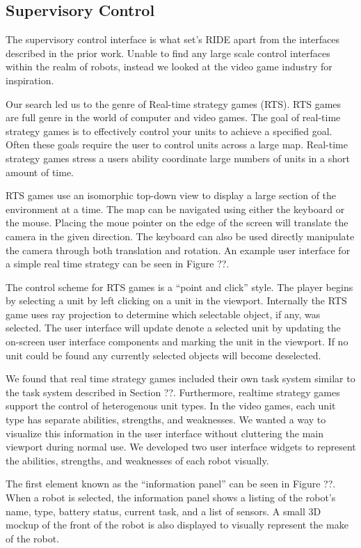 \subsection{Supervisory Control}
\label{subs:ui-supervisor}

The supervisory control interface is what set's RIDE apart from the interfaces described in the prior work. Unable to find any large scale control interfaces within the realm of robots, instead we looked at the video game industry for inspiration.

Our search led us to the genre of Real-time strategy games (RTS). RTS games are full genre in the world of computer and video games. The goal of real-time strategy games is to effectively control your units to achieve a specified goal. Often these goals require the user to control units across a large  map. Real-time strategy games stress a users ability coordinate large numbers of units in a short amount of time. 

RTS games use an isomorphic top-down view to display a large section of the environment at a time. The map can be navigated using either the keyboard or the mouse. Placing the moue pointer on the edge of the screen will translate the camera in the given direction. The keyboard can also be used directly manipulate the camera through both translation and rotation. An example user interface for a simple real time strategy can be seen in Figure ??. 

The control scheme for RTS games is a ``point and click'' style. The player begins by selecting a unit by left clicking on a unit in the viewport. Internally the RTS game uses ray projection to determine which selectable object, if any, was selected. The user interface will update denote a selected unit by updating the on-screen user interface components and marking the unit in the viewport. If no unit could be found any currently selected objects will become deselected.

We found that real time strategy games included their own task system similar to the task system described in Section ??. Furthermore, realtime strategy games support the control of heterogenous unit types. In the video games,  each unit type has separate abilities, strengths, and weaknesses. We wanted a way to visualize this information in the user interface without cluttering the main viewport during normal use. We developed two user interface widgets to represent the abilities, strengths, and weaknesses of each robot visually. 

The first element known as the ``information panel'' can be seen in Figure ??. When a robot is selected, the information panel shows a listing of the robot's name, type, battery status, current task, and a list of sensors. A small 3D mockup of the front of the robot is also displayed to visually represent the make of the robot.


